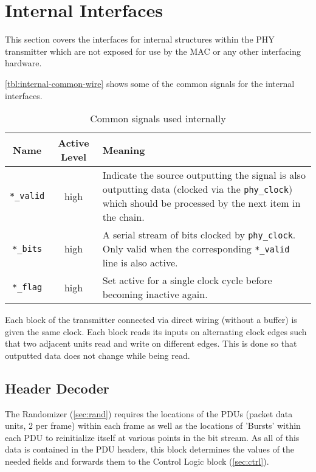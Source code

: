 \documentclass[dvips,10pt,twocolumn]{article}
\begin{document}
\section{Internal Interfaces}
This section covers the interfaces for internal structures within the PHY
transmitter which are not exposed for use by the MAC or any other interfacing
hardware.

\autoref{tbl:internal-common-wire} shows some of the common signals for
the internal interfaces.

\begin{table*}
\begin{tabulary}{\textwidth}{c|C|L}
	\label{tbl:internal-common-wire}
	Name & Active Level & Meaning \\ \hline
	
	\texttt{*\_valid} & high & Indicate the source outputting the signal
	is also outputting data (clocked via the \texttt{phy\_clock}) which
	should be processed by the next item in the chain. \\

	\texttt{*\_bits} & high & A serial stream of bits clocked by
	\texttt{phy\_clock}. Only valid when the corresponding
	\texttt{*\_valid} line is also active. \\

	\texttt{*\_flag} & high & Set active for a single clock cycle
	before becoming inactive again.
\end{tabulary}
\caption{Common signals used internally}
\end{table*}

Each block of the transmitter connected via direct wiring (without a
buffer) is given the same clock. Each block reads its inputs on alternating
clock edges such that two adjacent units read and write on different edges.
This is done so that outputted data does not change while being read.

	\subsection{Header Decoder}
	\label{sec:header}
	The Randomizer (\autoref{sec:rand}) requires the locations of the
	PDUs (packet data units, 2 per frame) within each frame as well as
	the locations of 'Bursts' within each PDU to reinitialize itself at
	various points in the bit stream. As all of this data is contained
	in the PDU headers, this block determines the values of the needed
	fields and forwards them to the Control Logic block
	(\autoref{sec:ctrl}). 
\end{document}
